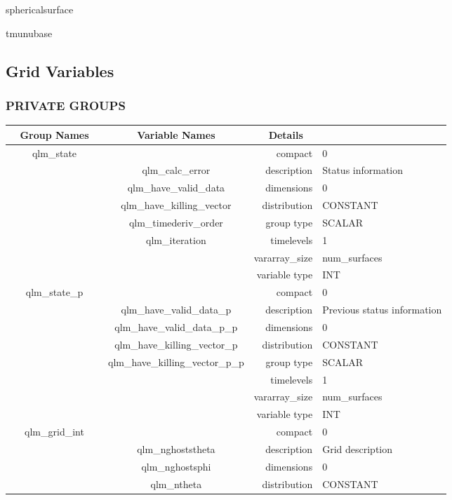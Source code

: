 sphericalsurface

tmunubase
\vspace{2mm}
\subsection*{Grid Variables}
\vspace{5mm}\subsubsection{PRIVATE GROUPS}

\vspace{5mm}

\begin{tabular*}{150mm}{|c|c@{\extracolsep{\fill}}|rl|} \hline 
~ {\bf Group Names} ~ & ~ {\bf Variable Names} ~  &{\bf Details} ~ & ~\\ 
\hline 
qlm\_state &  & compact & 0 \\ 
 & qlm\_calc\_error & description & Status information \\ 
 & qlm\_have\_valid\_data & dimensions & 0 \\ 
 & qlm\_have\_killing\_vector & distribution & CONSTANT \\ 
 & qlm\_timederiv\_order & group type & SCALAR \\ 
 & qlm\_iteration & timelevels & 1 \\ 
 &  & vararray\_size & num\_surfaces \\ 
 &  & variable type & INT \\ 
\hline 
qlm\_state\_p &  & compact & 0 \\ 
 & qlm\_have\_valid\_data\_p & description & Previous status information \\ 
 & qlm\_have\_valid\_data\_p\_p & dimensions & 0 \\ 
 & qlm\_have\_killing\_vector\_p & distribution & CONSTANT \\ 
 & qlm\_have\_killing\_vector\_p\_p & group type & SCALAR \\ 
 &  & timelevels & 1 \\ 
 &  & vararray\_size & num\_surfaces \\ 
 &  & variable type & INT \\ 
\hline 
qlm\_grid\_int &  & compact & 0 \\ 
 & qlm\_nghoststheta & description & Grid description \\ 
 & qlm\_nghostsphi & dimensions & 0 \\ 
 & qlm\_ntheta & distribution & CONSTANT \\ 

\end{tabular*}
